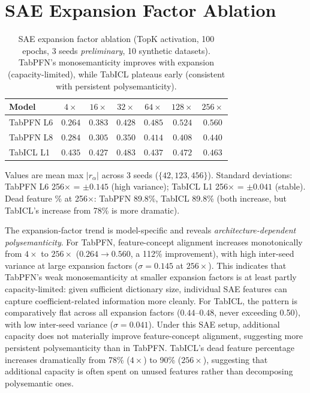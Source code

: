 \documentclass{article}
\begin{document}
\section{SAE Expansion Factor Ablation}
\label{app:sae-ablation}

\begin{table}[htbp]
\centering
\caption{SAE expansion factor ablation (TopK activation, 100 epochs, 3 seeds \textit{preliminary}, 10 synthetic datasets). TabPFN's monosemanticity improves with expansion (capacity-limited), while TabICL plateaus early (consistent with persistent polysemanticity).}
\label{tab:sae-ablation}
\small
\begin{tabular}{@{}l cccccc@{}}
\toprule
Model & $4\times$ & $16\times$ & $32\times$ & $64\times$ & $128\times$ & $256\times$ \\
\midrule
TabPFN L6 & $0.264$ & $0.383$ & $0.428$ & $0.485$ & $0.524$ & $\mathbf{0.560}$ \\
TabPFN L8 & $0.284$ & $0.305$ & $0.350$ & $0.414$ & $0.408$ & $\mathbf{0.440}$ \\
TabICL L1 & $\mathbf{0.435}$ & $0.427$ & $0.483$ & $0.437$ & $0.472$ & $0.463$ \\
\bottomrule
\end{tabular}

\vspace{2pt}
{\footnotesize Values are mean max $|r_\alpha|$ across 3 seeds ($\{42, 123, 456\}$). Standard deviations: TabPFN L6 256$\times$ = $\pm 0.145$ (high variance); TabICL L1 256$\times$ = $\pm 0.041$ (stable). Dead feature \% at 256$\times$: TabPFN 89.8\%, TabICL 89.8\% (both increase, but TabICL's increase from 78\% is more dramatic).}
\end{table}

The expansion-factor trend is model-specific and reveals \textit{architecture-dependent polysemanticity}. For TabPFN, feature-concept alignment increases monotonically from $4\times$ to $256\times$ ($0.264 \to 0.560$, a 112\% improvement), with high inter-seed variance at large expansion factors ($\sigma = 0.145$ at $256\times$). This indicates that TabPFN's weak monosemanticity at smaller expansion factors is at least partly capacity-limited: given sufficient dictionary size, individual SAE features can capture coefficient-related information more cleanly. For TabICL, the pattern is comparatively flat across all expansion factors ($0.44$--$0.48$, never exceeding 0.50), with low inter-seed variance ($\sigma = 0.041$). Under this SAE setup, additional capacity does not materially improve feature-concept alignment, suggesting more persistent polysemanticity than in TabPFN. TabICL's dead feature percentage increases dramatically from 78\% ($4\times$) to 90\% ($256\times$), suggesting that additional capacity is often spent on unused features rather than decomposing polysemantic ones.
\end{document}
